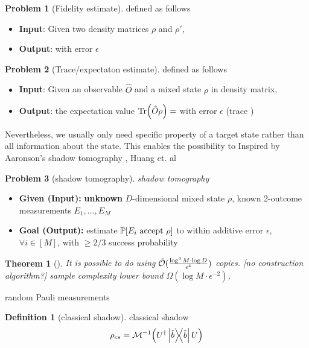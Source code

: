 \documentclass[
10pt,
aps,
pra,
linenumbers,
floatfix,
]{revtex4-2}
\theoremstyle{plain}
\newtheorem{theorem}{Theorem}
\theoremstyle{definition}
\newtheorem{definition}{Definition}
\newtheorem{problem}{Problem}
\newcommand{\ob}{\hat{O}}
\newcommand{\dm}{\rho}
\begin{document}
\begin{problem}[Fidelity estimate]
	defined as follows
	\begin{itemize}
		\item \textbf{Input}: Given two density matrices $\dm$ and $\dm'$, 
		\item \textbf{Output}:  with error $\epsilon$
	\end{itemize}
\end{problem}
\begin{problem}[Trace/expectaton estimate]
	defined as follows
	\begin{itemize}
		\item \textbf{Input}: Given an observable $\ob$ and a mixed state $\dm$ in density matrix,
		\item \textbf{Output}: the expectation value $\Tr(\ob \dm) = $ with error $\epsilon$ (trace )
	\end{itemize}
\end{problem}
Nevertheless, we usually only need specific property of a target state rather than all information about the state.
This enables the possibility to
Inspired by Aaronson's shadow tomography \cite{aaronsonShadowTomographyQuantum2018}, Huang et. al \cite{huangPredictingManyProperties2020}
\begin{problem}[shadow tomography]\label{prm:shadow_tomography}
	\emph{shadow tomography}
	\begin{itemize}
		\item \textbf{Given (Input):} \textbf{unknown} $D$-dimensional mixed state $\rho$, known 2-outcome measurements $E_1,\dots,E_M$
		\item \textbf{Goal (Output):} estimate $\probability[E_i \text{ accept } \dm]$ to within additive error $\epsilon$, $\forall i\in [M]$, with $\ge 2/3$ success probability
	\end{itemize}
\end{problem}
\begin{theorem}[\cite{aaronsonShadowTomographyQuantum2018}]\label{thm:shadow_tomography}
	It is possible to do  using $\tilde{\mathcal{O}}(\frac{\log^4 M\cdot \log D}{\epsilon^4})$ copies. [no construction algorithm?]
	sample complexity lower bound $\Omega(\log M\cdot \epsilon^{-2})$, 
\end{theorem}
random Pauli measurements
\begin{definition}[classical shadow]\label{def:classical_shadow}
	classical shadow
	\begin{equation}
		\dm_{cs} = \mathcal{M}^{-1} \qty(U^\dagger \op{\hat{b}} U)
	\end{equation}
\end{definition}
\end{document}
